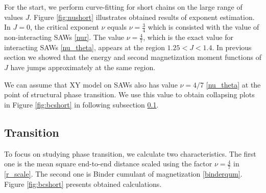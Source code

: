 For the start, we perform curve-fitting for short chains on the large range of values $J$. Figure \ref{fig:nushort} illustrates obtained results of exponent estimation. In $J=0$, the critical exponent $\nu$ equals $\nu = \frac{3}{4}$  which is consisted with the value of non-interacting SAWs \eqref{nur}. The value $\nu=\frac{4}{7}$, which is the exact value
for interacting SAWs \eqref{nu_theta}, appears at the region $ 1.25 < J < 1.4$. In previous section we showed that the energy and second magnetization moment functions of $J$ have jumps approximately at the same region. 

  We can assume that XY model on SAWs also has value $\nu = 4/7$ \eqref{nu_theta} at the point of structural phase transition. We use this value to obtain collapsing plots in Figure \ref{fig:bcshort} in following subsection \ref{section:Transition}. 




\subsection{Transition} \label{section:Transition}
To focus on studying phase transition, we calculate two characteristics. The first one is the mean square end-to-end distance scaled using the factor $\nu = \frac{4}{7}$ in \eqref{r_scale}. The second one is Binder cumulant of magnetization \eqref{binderqum}. Figure \ref{fig:bcshort}  presents obtained calculations. 

